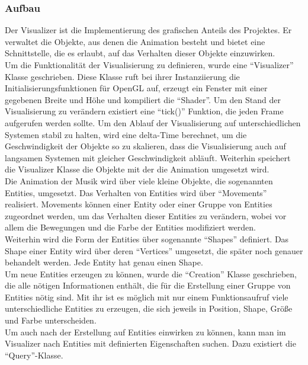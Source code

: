 \documentclass[11pt,a4paper]{article}
\begin{document}
\subsubsection{Aufbau}
Der Visualizer ist die Implementierung des grafischen Anteils des Projektes. Er verwaltet die Objekte, aus denen die Animation besteht und bietet eine Schnittstelle, die es erlaubt, auf das Verhalten dieser Objekte einzuwirken.\\
Um die Funktionalität der Visualisierung zu definieren, wurde eine ``Visualizer'' Klasse geschrieben. Diese Klasse ruft bei ihrer Instanziierung die Initialisierungsfunktionen für OpenGL auf, erzeugt ein Fenster mit einer gegebenen Breite und Höhe und kompiliert die ``Shader''. Um den Stand der Visualisierung zu verändern existiert eine ``tick()'' Funktion, die jeden Frame aufgerufen werden sollte. Um den Ablauf der Visualisierung auf unterschiedlichen Systemen stabil zu halten, wird eine delta-Time berechnet, um die Geschwindigkeit der Objekte so zu skalieren, dass die Visualisierung auch auf langsamen Systemen mit gleicher Geschwindigkeit abläuft. Weiterhin speichert die Visualizer Klasse die Objekte mit der die Animation umgesetzt wird.\\
Die Animation der Musik wird über viele kleine Objekte, die sogenannten Entities, umgesetzt. Das Verhalten von Entities wird über ``Movements'' realisiert. Movements können einer Entity oder einer Gruppe von Entities zugeordnet werden, um das Verhalten dieser Entities zu verändern, wobei vor allem die Bewegungen und die Farbe der Entities modifiziert werden.\\
Weiterhin wird die Form der Entities über sogenannte ``Shapes'' definiert. Das Shape einer Entity wird über deren ``Vertices'' umgesetzt, die später noch genauer behandelt werden. Jede Entity hat genau einen Shape.\\
Um neue Entities erzeugen zu können, wurde die ``Creation'' Klasse geschrieben, die alle nötigen Informationen enthält, die für die Erstellung einer Gruppe von Entities nötig sind. Mit ihr ist es möglich mit nur einem Funktionsaufruf viele unterschiedliche Entities zu erzeugen, die sich jeweils in Position, Shape, Größe und Farbe unterscheiden.\\
Um auch nach der Erstellung auf Entities einwirken zu können, kann man im Visualizer nach Entities mit definierten Eigenschaften suchen. Dazu existiert die ``Query''-Klasse.

\end{document}
